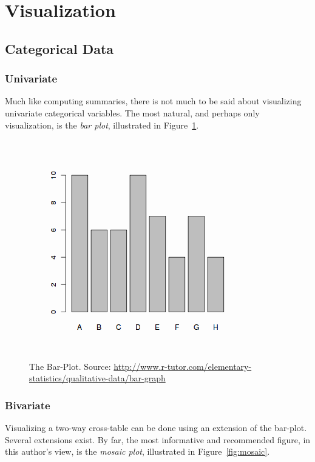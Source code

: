 \documentclass[12pt,a4paper]{report}
\begin{document}
\section{Visualization}

\subsection{Categorical Data}

\subsubsection{Univariate}
Much like computing summaries, there is not much to be said about visualizing univariate categorical variables. 
The most natural, and perhaps only visualization, is the \emph{bar plot}, illustrated in Figure~\ref{fig:barplot}.

\begin{figure}[t]
\centering
\includegraphics[width=0.7\linewidth]{art/categorical-data1x}
\caption[Bar Plot]{The Bar-Plot. Source: \url{http://www.r-tutor.com/elementary-statistics/qualitative-data/bar-graph}}
\label{fig:barplot}
\end{figure}



\subsubsection{Bivariate}
Visualizing a two-way cross-table can be done using an extension of the bar-plot.
Several extensions exist. By far, the most informative and recommended figure, in this author's view, is the \emph{mosaic plot}, illustrated in Figure~\ref{fig:mosaic}. 
\end{document}
